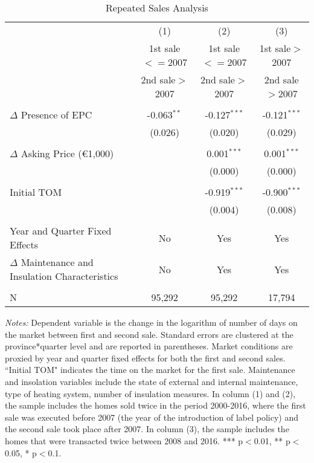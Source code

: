 \documentclass[12pt]{article}
\begin{document}
\clearpage
\newpage
\begin{table}[H]
\footnotesize
  \centering
  \caption{Repeated Sales Analysis}
      \begin{tabular}{lccc}
\hline
                &\multicolumn{1}{c}{(1)}&\multicolumn{1}{c}{(2)}&\multicolumn{1}{c}{(3)}\\
&	1st sale$<=$2007  & 	1st sale$<=$2007 & 1st sale$>$2007 \\
& 2nd sale$>$2007 & 2nd sale$>$2007 & 2nd sale$>$2007 \\
\hline
&&&\\
$\Delta$ Presence of EPC& 	-0.063$^{**}$ & -0.127$^{***}$ & -0.121$^{***}$ \\
& (0.026) & (0.020) & (0.029) \\
&&&\\
$\Delta$ Asking Price (\euro 1,000) & & 	0.001$^{***}$ & 0.001$^{***}$ \\
& &  (0.000) & (0.000) \\
&&&\\
Initial TOM	 & &	-0.919$^{***}$ & -0.900$^{***}$ \\
& & (0.004)	& (0.008) \\
&&&\\
Year and Quarter Fixed Effects & No & Yes & Yes \\
$\Delta$ Maintenance and Insulation Characteristics	& No &	Yes &	Yes \\
&&&\\
N	& 95,292 &	95,292 &	17,794 \\
\hline

    \end{tabular}%
\begin{tablenotes}
\scriptsize
\item \textit{Notes:} Dependent variable is the change in the logarithm of number of days on the market between first and second sale. Standard errors are clustered at the province*quarter level and are reported in parentheses. Market conditions are proxied by year and quarter fixed effects for both the first and second sales. ``Initial TOM" indicates the time on the market for the first sale. Maintenance and insolation variables include the state of external and internal maintenance, type of heating system, number of insulation measures. In column (1) and (2), the sample includes the homes sold twice in the period 2000-2016, where the first sale was executed before 2007 (the year of the introduction of label policy) and the second sale took place after 2007. In column (3), the sample includes the homes that were transacted twice between 2008 and 2016. *** p$<$0.01, ** p$<$0.05, * p$<$0.1. 
\end{tablenotes}

  \label{tab:addlabel}%
\end{table}%
\end{document}

